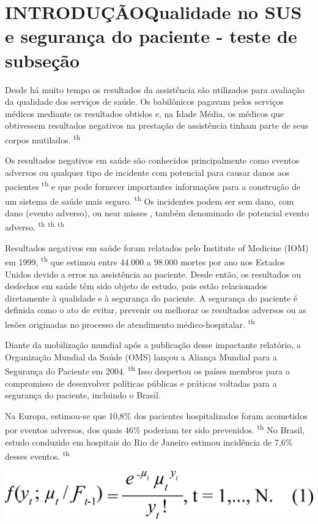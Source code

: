 \documentclass{article}
\begin{document}
\section{INTRODUÇÃOQualidade no SUS e segurança do paciente - teste de subseção}

Desde há muito tempo os resultados da assistência são utilizados para avaliação
da
qualidade dos serviços de saúde. Os babilônicos pagavam pelos serviços médicos
mediante os
resultados obtidos e, na Idade Média, os médicos que obtivessem resultados
negativos na
prestação de assistência tinham parte de seus corpos mutilados.
\textsuperscript{th}

Os resultados negativos em saúde são conhecidos principalmente como eventos
adversos ou
qualquer tipo de incidente com potencial para causar danos aos pacientes
\textsuperscript{th}
e que pode fornecer importantes informações para a construção de um sistema de
saúde
mais seguro. \textsuperscript{th}
Os incidentes podem ser sem dano, com dano (evento adverso), ou near
misses , também denominado de potencial evento adverso. \textsuperscript{th}
\textsuperscript{th}
\textsuperscript{th}

Resultados negativos em saúde foram relatados pelo Institute of Medicine
(IOM) em 1999, \textsuperscript{th}
que estimou entre 44.000 a 98.000 mortes por ano nos Estados Unidos devido a
erros
na assistência ao paciente. Desde então, os resultados ou desfechos em saúde têm
sido objeto
de estudo, pois estão relacionados diretamente à qualidade e à segurança do
paciente. A
segurança do paciente é definida como o ato de evitar, prevenir ou melhorar os
resultados
adversos ou as lesões originadas no processo de atendimento médico-hospitalar.
\textsuperscript{th}

Diante da mobilização mundial após a publicação desse impactante relatório, a
Organização
Mundial da Saúde (OMS) lançou a Aliança Mundial para a Segurança do Paciente em
2004. \textsuperscript{th}
Isso despertou os países membros para o compromisso de desenvolver políticas
públicas e práticas voltadas para a segurança do paciente, incluindo o Brasil.

Na Europa, estimou-se que 10,8\% dos pacientes hospitalizados foram acometidos
por eventos
adversos, dos quais 46\% poderiam ter sido prevenidos. \textsuperscript{th}
No Brasil, estudo conduzido em hospitais do Rio de Janeiro estimou incidência de
7,6\% desses eventos. \textsuperscript{th}

\includegraphics[width=\textwidth]{0034-8910-rsp-48-3-0451-ee01.jpg}
\end{document}
